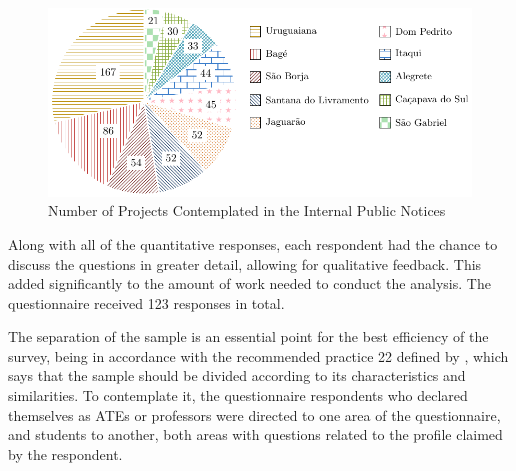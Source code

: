 \begin{figure}[htb]
  \caption{Number of Projects Contemplated in the Internal Public Notices}\label{fig:number-of-projects}
  \begin{center}
    \includegraphics[width=16cm]{img/5-number-of-projects.pdf}
  \end{center}
\end{figure}


Along with all of the quantitative responses, each respondent had the chance to discuss the questions in greater detail, allowing for qualitative feedback. This added significantly to the amount of work needed to conduct the analysis. The questionnaire received 123 responses in total.


The separation of the sample is an essential point for the best efficiency of the survey, being in accordance with the recommended practice 22 defined by , which says that the sample should be divided according to its characteristics and similarities.
To contemplate it, the questionnaire respondents who declared themselves as \acp{ATE} or professors were directed to one area of the questionnaire, and students to another, both areas with questions related to the profile claimed by the respondent.
